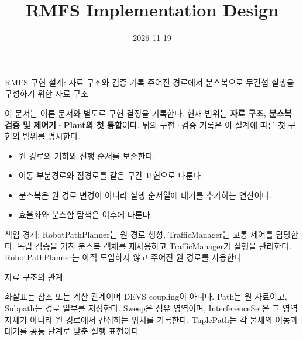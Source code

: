 
\title{RMFS Implementation Design}
\date{2026-11-19}


\begin{frame}{RMFS 구현 설계: 자료 구조와 검증 기록}
\large 주어진 경로에서 분스복으로 무간섭 실행을 구성하기 위한 자료 구조
\par\bigskip\normalsize
이 문서는 이론 문서와 별도로 구현 결정을 기록한다.
현재 범위는 \textbf{자료 구조, 분스복 검증 및 제어기·Plant의 첫 통합}이다.
뒤의 구현·검증 기록은 이 설계에 따른 첫 구현의 범위를 명시한다.
\par\bigskip
\begin{itemize}
\item 원 경로의 기하와 진행 순서를 보존한다.
\item 이동 부분경로와 점경로를 같은 구간 표현으로 다룬다.
\item 분스복은 원 경로 변경이 아니라 실행 순서열에 대기를 추가하는 연산이다.
\item 효율화와 분스합 탐색은 이후에 다룬다.
\end{itemize}
\par\medskip\small
책임 경계: RobotPathPlanner는 원 경로 생성, TrafficManager는 교통 제어를 담당한다.
독립 검증을 거친 분스복 객체를 재사용하고 TrafficManager가 실행을 관리한다.
RobotPathPlanner는 아직 도입하지 않고 주어진 원 경로를 사용한다.
\end{frame}

\begin{frame}{자료 구조의 관계}
\begin{center}\end{center}
\small 화살표는 참조 또는 계산 관계이며 DEVS coupling이 아니다.
Path는 원 자료이고, Subpath는 경로 일부를 지정한다.
Sweep은 점유 영역이며, InterferenceSet은 그 영역 자체가 아니라 원 경로에서 간섭하는 위치를 기록한다.
TuplePath는 각 물체의 이동과 대기를 공통 단계로 맞춘 실행 표현이다.
\end{frame}

